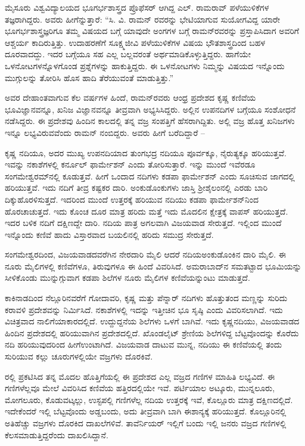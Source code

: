 ಮೈಸೂರು ವಿಶ್ವವಿದ್ಯಾಲಯದ ಭೂಗರ್ಭಶಾಸ್ತ್ರದ ಪ್ರೊಫೆಸರ್‍ ಆಗಿದ್ದ ಎಲ್‍. ರಾಮರಾವ್‍ ಪಳೆಯುಳಿಕೆಗಳ ತಜ್ಞರಾಗಿದ್ದರು. ಅವರು ಹೀಗೆನ್ನುತ್ತಾರೆ: “ಸಿ. ವಿ. ರಾಮನ್‍ ರವರನ್ನು ಭೇಟಿಯಾಗುವ ಸುಯೋಗವಿದ್ದ ಯಾರೇ ಭೂಗರ್ಭಶಾಸ್ತ್ರಜ್ಞರಿಗೂ ತಮ್ಮ ವಿಷಯದ ಬಗ್ಗೆ ಯಾವುದೇ ಅಂಗಗಳ ಬಗ್ಗೆ ರಾಮನ್‍ರವರನ್ನು ಪ್ರಸ್ತಾಪಿಸಿದಾಗ ಅವರಿಗೆ ಆಶ್ಚರ್ಯ ಕಾದಿರುತ್ತಿತ್ತು. ಉದಾಹರಣೆಗೆ \enginline{--} ಸೂಕ್ಷ್ಮಜೀವಿ ಪಳೆಯುಳಿಕೆಗಳ ವಿಷಯ ಭೌತಶಾಸ್ತ್ರದಿಂದ ಬಹಳ ದೂರವಾದದ್ದು. ಇದರ ಬಗ್ಗೆಯೂ ಸಹ ಎಲ್ಲ ಬಲ್ಲವರಂತೆ ಅರ್ಥಮಾಡಿಕೊಳ್ಳುತ್ತಿದ್ದರು. ಹಾಗೆಯೇ ಒಳನೋಟಗಳನ್ನೊಳಗೊಂಡ ಪ್ರಶ್ನೆಗಳನ್ನು ಹಾಕುತ್ತಿದ್ದರು. ಈ ಒಳನೋಟಗಳು ನಿಮ್ಮನ್ನು ವಿಷಯದ ಇನ್ನೊಂದು ಮುಗ್ಗುಲನ್ನು ತೋರಿಸಿ ಹೊಸ ಹಾದಿ ತೆರೆಯುವಂತೆ ಮಾಡುತ್ತಿತ್ತು.”

\newpage

ಅವರ ದೇಹಾಂತವಾಗುವ ಕೆಲ ವರ್ಷಗಳ ಹಿಂದೆ, ರಾಮನ್‌ರವರು ಆಂಧ್ರ ಪ್ರದೇಶದ ಕೃಷ್ಣ ಕಣಿವೆಯ ಭೂವಿಜ್ಞಾನವನ್ನೂ, ಖನಿಜ ವಿಜ್ಞಾನವನ್ನೂ ತೀವ್ರವಾಗಿ ಅಭ್ಯಸಿಸಿದ್ದರು. ಅಲ್ಲಿನ ಉಪನದಿಗಳ ಬಗ್ಗೆಯೂ ಸಂಶೋಧನೆ ನಡೆಸಿದ್ದರು. ಈ ಪ್ರದೇಶವು ಹಿಂದಿನ ಕಾಲದಲ್ಲಿ ತನ್ನ ವಜ್ರ ಸಂಪತ್ತಿಗೆ ಹೆಸರಾಗಿದ್ದಿತು. ಅಲ್ಲಿ ವಜ್ರ ಹೊತ್ತ ಖನಿಜಗಳು ಇನ್ನೂ ಲಭ್ಯವಿರುವವೆಂದು ರಾಮನ್ ನಂಬಿದ್ದರು. ಅವರು ಹೀಗೆ ಬರೆದಿದ್ದಾರೆ –

ಕೃಷ್ಣ ನದಿಯೂ, ಅದರ ಮುಖ್ಯ ಉಪನದಿಯಾದ ತುಂಗಭದ್ರ ನದಿಯೂ ಪೂರ್ವಕ್ಕೂ, ನೈರುತ್ಯಕ್ಕೂ  ಹರಿಯುತ್ತವೆ. ಇವನ್ನು ನಕಾಶೆಗಳಲ್ಲಿ ಕರ್ನೂಲ್ ಫಾರ್ಮೇಶನ್ ಎಂದು ತೋರಿಸುತ್ತಾರೆ. ಇನ್ನು ಮುಂದೆ ಇವೆರಡೂ ಸಂಗಮೇಶ್ವರಮ್‍ನಲ್ಲಿ ಕೂಡುತ್ತವೆ. ಹೀಗೆ ಒಂದಾದ ನದಿಗಳು ಕಡಪಾ ಫಾರ್ಮೇಶನ್ ಎಂದು ಸೂಚಿಸುವ ಜಾಗದಲ್ಲಿ ಹರಿಯುತ್ತವೆ. ಇದು ನದಿಗೆ ತೀವ್ರ ಕಷ್ಟಕರ ದಾರಿ. ಅಂಕುಡೊಂಕುಗಳು ಜಾಸ್ತಿ ಶ‍್ರೀಶೈಲಂನಲ್ಲಿ ಎರಡು ಬಾರಿ ದಿಕ್ಕುಹೊರಳಿಸುತ್ತದೆ. ಇದರಿಂದ ಮುಂದೆ ಉತ್ತರಕ್ಕೆ ಹರಿಯುವ ನದಿಯು ಕಡಪಾ ಫಾರ್ಮೇಶನ್‌ನಿಂದ ಹೊರಚಾಚುತ್ತದೆ. ಇದು ಕೊಂಚ ದೂರ ಮಾತ್ರ ಹರಿದು ಮತ್ತೆ ಇದು ಮೊದಲಿನ ಕ್ಷೇತ್ರಕ್ಕೆ ವಾಪಸ್ ಹರಿಯುತ್ತದೆ. ಇದರ ಬಳಿಕ ನದಿಗೆ ದಕ್ಷಿಣದ್ದೇ ದಾರಿ. ನದಿಯ ಪಾತ್ರ ಅಗಲವಾಗಿ ವಿಜಯವಾಡ ಸೇರುತ್ತದೆ. ಇಲ್ಲಿಂದ ಮುಂದೆ ಇನ್ನೊಂದು ಕಣಿವೆ ಹಾದು ವಿಸ್ತಾರವಾದ ಬಯಲಿನಲ್ಲಿ ಹರಿದು ಸಮುದ್ರ ಸೇರುತ್ತದೆ.

ಸಂಗಮೇಶ್ವರದಿಂದ, ವಿಜಯವಾಡದವರೆಗಿನ ನೇರದಾರಿ  ಮೈಲಿ ಆದರೆ ನದಿಯ\break ಅಂಕುಡೊಂಕಿನ ದಾರಿ  ಮೈಲಿ. ಈ ನೂರು ಮೈಲಿಗಳಲ್ಲಿ ಕಣಿವೆಗಳೂ, ತಿರುವುಗಳೂ ಈ ಹಿಂದೆ ವಿವರಿಸಿದೆ. ಅಮರಾಬಾದ್‌ನ ಸಮತಟ್ಟಾದ ಭೂಮಿಯನ್ನು ಸೀಳಿಕೊಂಡು ಮುನ್ನುಗ್ಗುವಾಗ ಕಡಪಾ ಶಿಲೆಗಳ ನೂರು ಮೈಲಿಗಳ ಕಣಿವೆಯನ್ನುಂಟು ಮಾಡುತ್ತದೆ.

ಕಾಕಿನಾಡದಿಂದ ನೆಲ್ಲೂರಿನವರೆಗೆ ಗೋದಾವರಿ, ಕೃಷ್ಣ ಮತ್ತು ಪೆನ್ನಾರ್ ನದಿಗಳು ಹೊತ್ತುತಂದ ಮಣ್ಣನ್ನು ಸುರಿದು ಕರಾವಳಿ ಪ್ರದೇಶವನ್ನು ನಿರ್ಮಿಸಿದೆ. ನಕಾಶೆಗಳಲ್ಲಿ ಇದನ್ನು ಇತ್ತೀಚಿನ ಭೂ ಸೃಷ್ಠಿ ಎಂದು ವಿವರಿಸಲಾಗಿದೆ. ಇದು ವಿಚಿತ್ರವಾದ ನಾಲಿಗೆಯಾಕಾರದಲ್ಲಿದೆ. ಉದ್ದುದ್ದನೆಯ ಶಿಲೆಗಳು ಒಳಗೆ ಬಾಗಿವೆ. ಇದು ಕೃಷ್ಣನದಿಯು, ವಿಜಯವಾಡದ ಹಿಂದಿನ ಪ್ರದೇಶದಲ್ಲಿ ಹರಿಯುವಾಗಿನ ಪ್ರದೇಶದಲ್ಲಿದೆ. ಖೊಂಡಲೈಟ್ ಶ್ರೇಣಿಯ ಶಿಲೆಗಳಿದ್ದ ಬೆಟ್ಟವೊಂದನ್ನು ಕೊರೆದು ನದಿ ಹರಿಯುವುದ\-ರಿಂದ ಹೀಗೆಉಂಟಾಗಿದೆ. ವಿಜಯವಾಡ ದಾಟುವ ಮುನ್ನ, ನದಿಯು ಈ ಕಣಿವೆಯಲ್ಲಿ ತಂದು ಸುರಿಯುವ ಕಲ್ಲು ಚೂರುಗಳಲ್ಲಿಯೇ ವಜ್ರಗಳು ದೊರಕಿವೆ.

 ರಲ್ಲಿ  ಪ್ರಕಟಿಸಿದ ತನ್ನ ಮೊದಲ ಹೊತ್ತಿಗೆಯಲ್ಲಿ ಈ ಪ್ರದೇಶದ ಎಲ್ಲ ವಜ್ರದ ಗಣಿಗಳ ಮಾಹಿತಿ ಲಭ್ಯವಿದೆ. ಈ ಗಣಿಗಳೆಲ್ಲವೂ ಮೇಲೆ ವಿವರಿಸಿದ ಕಣಿವೆಯ ಹತ್ತಿರದಲ್ಲಿಯೇ ಇವೆ. ಪರ್ಟಿಯಾಲ ಅಟ್ಕೂರು, ಮುನ್ನಲೂರು, ಮೋಗಲೂರು, ಕೊಡುವಟ್ಕಲ್ಲು, ಉಸ್ಟಪಲ್ಲಿ ಗಣಿಗಳೆಲ್ಲ ನದಿಯ ಉತ್ತರಕ್ಕೆ ಇವೆ, ಕೊಲ್ಲೂರು ಮಾತ್ರ ದಕ್ಷಿಣದಲ್ಲಿದೆ. ಇದೇಕೆಂದರೆ ಇಲ್ಲಿ ಬೆಟ್ಟವೊಂದು ಅಡ್ಡಬಂದು, ಅದು ತೀವ್ರವಾಗಿ ಬಾಗಿ ಈಶಾನ್ಯಕ್ಕೆ ಹರಿಯುತ್ತದೆ. ಕೊಲ್ಲೂರಿನಲ್ಲಿ ಅತಿಹೆಚ್ಚು ವಜ್ರಗಳು ದೊರಕಿದ ದಾಖಲೆಗಳಿವೆ. ತಾವೆರ್ನಿಯರ್ ಇಲ್ಲಿಗೆ ಬಂದು ಇಲ್ಲಿ  ಜನರು ವಜ್ರದ ಗಣಿಗಳಲ್ಲಿ ಕೆಲಸಮಾಡುತ್ತಿದ್ದರೆಂದು ದಾಖಲಿಸಿದ್ದಾನೆ.


